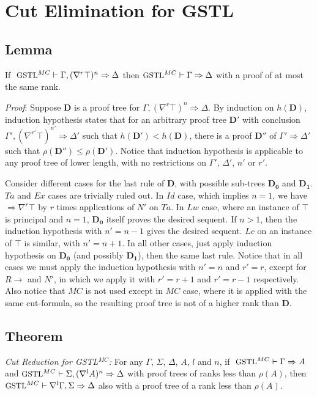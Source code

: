 \section{Cut Elimination for GSTL}

\subsection{Lemma}\label{true-assum} If $~\small\text{GSTL}^{MC} \vdash \Gamma , (\nabla^r \top)^n \Rightarrow \Delta$ then $\small\text{GSTL}^{MC} \vdash \Gamma \Rightarrow \Delta$ with a proof of at most the same rank.

\textit{Proof}: Suppose $\mathbf{D}$ is a proof tree for $\Gamma , (\nabla^r \top)^n \Rightarrow \Delta$. By induction on $h(\mathbf{D})$, induction hypothesis states that for an arbitrary proof tree $\mathbf{D}'$ with conclusion $\Gamma' , (\nabla^{r'} \top)^{n'} \Rightarrow \Delta'$ such that $h(\mathbf{D}') < h(\mathbf{D})$, there is a proof $\mathbf{D}''$ of $\Gamma' \Rightarrow \Delta'$ such that $\rho(\mathbf{D}'') \leq \rho(\mathbf{D}')$. Notice that induction hypothesis is applicable to any proof tree of lower length, with no restrictions on $\Gamma'$, $\Delta'$, $n'$ or $r'$.

Consider different cases for the last rule of $\mathbf{D}$, with possible sub-trees $\mathbf{D_0}$ and $\mathbf{D_1}$. $Ta$ and $Ex$ cases are trivially ruled out. In $Id$ case, which implies $n = 1$, we have $\Rightarrow \nabla^r \top$ by $r$ times applications of $N'$ on $Ta$. In $Lw$ case, where an instance of $\top$ is principal and $n = 1$, $\mathbf{D_0}$ itself proves the desired sequent. If $n > 1$, then the induction hypothesis with $n' = n - 1$ gives the desired sequent. $Lc$ on an instance of $\top$ is similar, with $n' = n + 1$. In all other cases, just apply induction hypothesis on $\mathbf{D_0}$ (and possibly $\mathbf{D_1}$), then the same last rule. Notice that in all cases we must apply the induction hypothesis with $n' = n$ and $r' = r$, except for $R\rightarrow$ and $N'$, in which we apply it with $r' = r + 1$ and $r' = r - 1$ respectively. Also notice that $MC$ is not used except in $MC$ case, where it is applied with the same cut-formula, so the resulting proof tree is not of a higher rank than $\mathbf{D}$.

\subsection{Theorem}\label{cut-admis} \emph{Cut Reduction for GSTL$^{MC}$: } For any $\Gamma$, $\Sigma$, $\Delta$, $A$, $l$ and $n$, if $~\small\text{GSTL}^{MC} \vdash \Gamma \Rightarrow A$ and $\small\text{GSTL}^{MC} \vdash \Sigma , (\nabla^l A)^n \Rightarrow \Delta$ with proof trees of ranks less than $\rho(A)$, then
 $\small\text{GSTL}^{MC} \vdash \nabla^l \Gamma , \Sigma \Rightarrow \Delta$ also with a proof tree of a rank less than $\rho(A)$.
 
